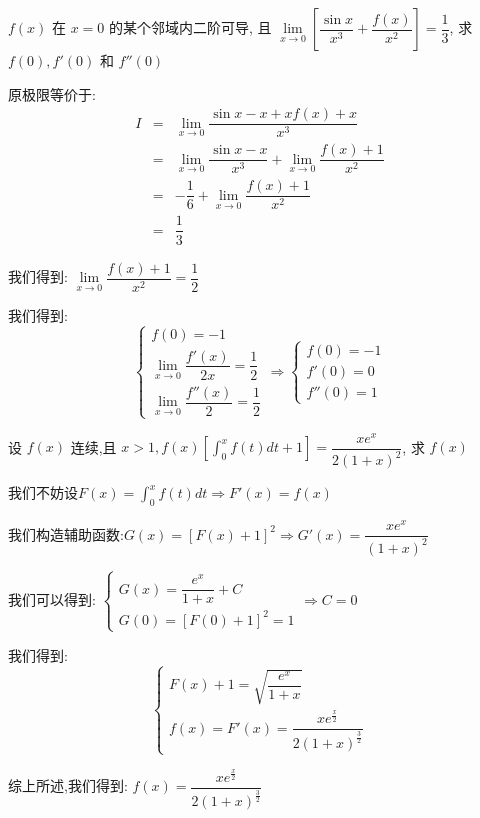 \begin{example}[][Exam: 34.3.13]
	$f(x)$ 在 $x=0$ 的某个邻域内二阶可导, 且 $\lim\limits_{x\to 0 }\left[\dfrac{\sin x}{x^3}+\dfrac{f(x)}{x^2}\right]=\dfrac{1}{3}$,
	求 $f(0), f'(0)$ 和 $f''(0)$
\end{example}
\begin{solution}

	原极限等价于:  
	\begin{eqnarray*}
		I&=&\lim\limits_{x\to 0 } \dfrac{\sin x-x+xf(x)+x}{x^3}\\
		&=&\lim\limits_{x\to 0 } \dfrac{\sin x-x}{x^3}+\lim\limits_{x\to 0 } \dfrac{f(x)+1}{x^2}\\
		&=&-\dfrac{1}{6}+\lim\limits_{x\to 0 } \dfrac{f(x)+1}{x^2}\\
		&=&\dfrac{1}{3}
	\end{eqnarray*}

	我们得到:  $\lim\limits_{x\to 0 } \dfrac{f(x)+1}{x^2}=\dfrac{1}{2}$
	
	我们得到:  
	$$\left\lbrace
	\begin{array}{l}
		f(0)=-1\\
		\lim\limits_{x\to 0}\dfrac{f'(x)}{2x}=\dfrac{1}{2}\\
		\lim\limits_{x\to 0}\dfrac{f''(x)}{2}=\dfrac{1}{2}
	\end{array}
	\right. \Rightarrow \left\lbrace
	\begin{array}{l}
		f(0)=-1\\
		f'(0)=0\\
		f''(0)=1
	\end{array}
	\right. $$
\end{solution}

\begin{example}[][Exam: 34.3.14]
	设 $f(x)$ 连续,且 $x>1, f(x)\left[\int_{0}^{x}f(t)dt+1\right]=\dfrac{xe^x}{2(1+x)^2}$, 求 $f(x)$
\end{example}

\begin{solution}

	我们不妨设$F(x)=\int_{0}^{x}f(t)dt\Rightarrow F'(x)=f(x)$
	
	我们构造辅助函数:$G(x)=\left[F(x)+1\right]^2\Rightarrow G'(x)=\dfrac{xe^x}{(1+x)^2}$
	
	我们可以得到:  $\left\lbrace
	\begin{array}{l}
		G(x)=\dfrac{e^x}{1+x}+C\\ G(0)=[F(0)+1]^2=1
	\end{array}
	\right. \Rightarrow C=0$
	
	我们得到:  $$\left\lbrace
	\begin{array}{l}
		F(x)+1=\sqrt{\dfrac{e^x}{1+x}}\\
		f(x)=F'(x)=\dfrac{xe^{\frac{x}{2}}}{2(1+x)^{\frac{3}{2}}}
	\end{array}
	\right. $$
	
	综上所述,我们得到:  $f(x)=\dfrac{xe^{\frac{x}{2}}}{2(1+x)^{\frac{3}{2}}}$
\end{solution}


